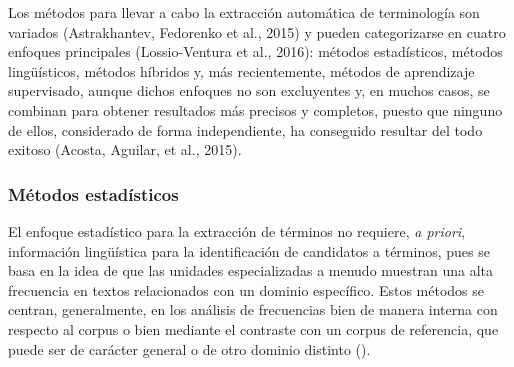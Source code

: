 Los métodos para llevar a cabo la extracción automática de terminología son variados (Astrakhantev, Fedorenko et al., 2015) y pueden categorizarse en cuatro enfoques principales (Lossio-Ventura et al., 2016): métodos estadísticos, métodos lingüísticos, métodos híbridos y, más recientemente, métodos de aprendizaje supervisado, aunque dichos enfoques no son excluyentes y, en muchos casos, se combinan para obtener resultados más precisos y completos, puesto que ninguno de ellos, considerado de forma independiente, ha conseguido resultar del todo exitoso (Acosta, Aguilar, et al., 2015).

\subsubsection{Métodos estadísticos} \label{subsec:stat_methods}

El enfoque estadístico para la extracción de términos no requiere, \textit{a priori}, información lingüística para la identificación de candidatos a términos, pues se basa en la idea de que las unidades especializadas a menudo muestran una alta frecuencia en textos relacionados con un dominio específico. Estos métodos se centran, generalmente, en los análisis de frecuencias bien de manera interna con respecto al corpus o bien mediante el contraste con un corpus de referencia, que puede ser de carácter general o de otro dominio distinto (\cite{cabre2008como}).

